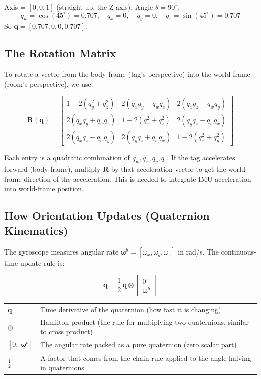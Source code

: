 \documentclass[11pt,a4paper]{article}
\newcommand{\vect}[1]{\bm{#1}}
\newcommand{\mat}[1]{\mathbf{#1}}
\begin{document}
\begin{worked}
Axis = $[0, 0, 1]$ (straight up, the Z axis). Angle $\theta = 90^\circ$.
\[
q_w = \cos(45^\circ) = 0.707,\quad q_x = 0,\quad q_y = 0,\quad q_z = \sin(45^\circ) = 0.707
\]
So $\vect{q} = [0.707, 0, 0, 0.707]$.
\end{worked}

\subsection{The Rotation Matrix}

To rotate a vector from the body frame (tag's perspective) into the world frame (room's perspective), we use:

\begin{equation}
\mat{R}(\vect{q}) = \begin{bmatrix}
1 - 2(q_y^2+q_z^2) & 2(q_xq_y - q_wq_z) & 2(q_xq_z + q_wq_y) \\
2(q_xq_y+q_wq_z) & 1 - 2(q_x^2+q_z^2) & 2(q_yq_z - q_wq_x) \\
2(q_xq_z-q_wq_y) & 2(q_yq_z+q_wq_x) & 1 - 2(q_x^2+q_y^2)
\end{bmatrix}
\end{equation}

Each entry is a quadratic combination of $q_w, q_x, q_y, q_z$. If the tag accelerates forward (body frame), multiply $\mat{R}$ by that acceleration vector to get the world-frame direction of the acceleration. This is needed to integrate IMU acceleration into world-frame position.

\subsection{How Orientation Updates (Quaternion Kinematics)}

The gyroscope measures angular rate $\vect{\omega}^b = [\omega_x, \omega_y, \omega_z]$ in rad/s. The continuous-time update rule is:

\begin{equation}
\dot{\vect{q}} = \frac{1}{2}\,\vect{q} \otimes \begin{bmatrix}0 \\ \vect{\omega}^b\end{bmatrix}
\label{eq:qdot}
\end{equation}

\begin{symbols}
\begin{tabular}{ll}
$\dot{\vect{q}}$ & Time derivative of the quaternion (how fast it is changing) \\
$\otimes$ & Hamilton product (the rule for multiplying two quaternions, similar to cross product) \\
$[0,\;\vect{\omega}^b]$ & The angular rate packed as a pure quaternion (zero scalar part) \\
$\tfrac{1}{2}$ & A factor that comes from the chain rule applied to the angle-halving in quaternions \\
\end{tabular}
\end{symbols}
\end{document}
